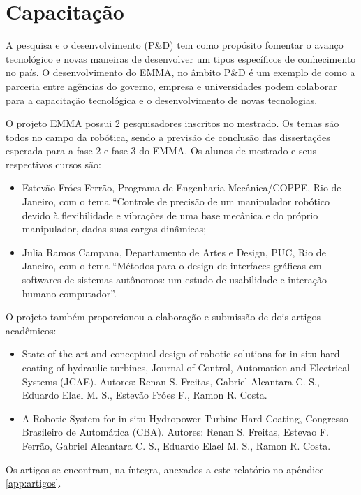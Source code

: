 \section{Capacitação}

A pesquisa e o desenvolvimento (P\&D) tem como propósito fomentar o avanço
tecnológico e novas maneiras de desenvolver um tipos específicos de conhecimento
no país. O desenvolvimento do EMMA, no âmbito P\&D é um exemplo de como a
parceria entre agências do governo, empresa e universidades podem colaborar para
a capacitação tecnológica e o desenvolvimento de novas tecnologias.

O projeto EMMA possui 2 pesquisadores inscritos no mestrado. Os temas são todos
no campo da robótica, sendo a previsão de conclusão das dissertações
esperada para a fase 2 e fase 3 do EMMA. Os alunos de mestrado e seus
respectivos cursos são:

\begin{itemize}
  \item Estevão Fróes Ferrão, Programa de Engenharia Mecânica/COPPE, Rio de
  Janeiro, com o tema ``Controle de precisão de um manipulador robótico devido à
  flexibilidade e vibrações de uma base mecânica e do próprio manipulador, dadas
  suas cargas dinâmicas;
  \item Julia Ramos Campana, Departamento de Artes e Design, PUC, Rio de
  Janeiro, com o tema ``Métodos para o design de interfaces gráficas em
softwares de sistemas autônomos: um estudo de usabilidade e interação
humano-computador''.
\end{itemize}
O projeto também proporcionou a elaboração e submissão de dois artigos
acadêmicos:

\begin{itemize}
  \item State of the art and conceptual design of robotic solutions for in situ
  hard coating of hydraulic turbines, Journal of Control, Automation and
  Electrical Systems (JCAE). Autores: Renan S. Freitas, Gabriel Alcantara C. S.,
  Eduardo Elael M. S., Estevão Fróes F., Ramon R. Costa.
  \item A Robotic System for in situ Hydropower Turbine Hard Coating, Congresso
  Brasileiro de Automática (CBA). Autores: Renan S. Freitas, Estevao F. Ferrão,
  Gabriel Alcantara C. S., Eduardo Elael M. S., Ramon R. Costa.
\end{itemize}

Os artigos se encontram, na íntegra, anexados a este relatório no apêndice
\ref{app:artigos}.



